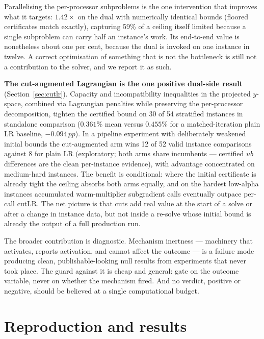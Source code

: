 \documentclass[11pt,a4paper]{article}
\newcommand{\pp}{\,pp}
\begin{document}
Parallelising the per-processor subproblems is the one intervention that improves
what it targets: $1.42\times$ on the dual with numerically identical bounds (floored certificates match exactly), capturing
59\% of a ceiling itself limited because a single subproblem can carry half an
instance's work. Its end-to-end value is nonetheless about one per cent, because
the dual is invoked on one instance in twelve. A correct optimisation of something
that is not the bottleneck is still not a contribution to the solver, and we
report it as such.

\textbf{The cut-augmented Lagrangian is the one positive dual-side result}
(Section~\ref{sec:cutlr}).  Capacity and incompatibility inequalities in the
projected $y$-space, combined via Lagrangian penalties while preserving the
per-processor decomposition, tighten the certified bound on 30 of 54 stratified
instances in standalone comparison ($0.361\%$ mean versus $0.455\%$ for a
matched-iteration plain LR baseline, $-0.094\pp$).  In a pipeline experiment
with deliberately weakened initial bounds the cut-augmented arm wins 12 of 52
valid instance comparisons against 8 for plain LR (exploratory; both arms share
incumbents --- certified $ub$ differences are the clean per-instance evidence),
with advantage concentrated on medium-hard instances.  The
benefit is conditional: where the initial certificate is already tight the
ceiling absorbs both arms equally, and on the hardest low-alpha instances
accumulated warm-multiplier subgradient calls eventually outpace per-call
cutLR.  The net picture is that cuts add real value at the start of a solve or
after a change in instance data, but not inside a re-solve whose initial bound
is already the output of a full production run.

The broader contribution is diagnostic. Mechanism inertness --- machinery that
activates, reports activation, and cannot affect the outcome --- is a failure mode
producing clean, publishable-looking null results from experiments that never took
place. The guard against it is cheap and general: gate on the outcome variable,
never on whether the mechanism fired. And no verdict, positive or negative, should
be believed at a single computational budget.

\appendix

\section{Reproduction and results}\label{app:repro}
\end{document}
